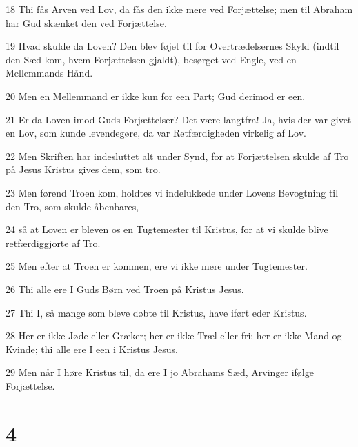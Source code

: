 \par 18 Thi fås Arven ved Lov, da fås den ikke mere ved Forjættelse; men til Abraham har Gud skænket den ved Forjættelse.
\par 19 Hvad skulde da Loven? Den blev føjet til for Overtrædelsernes Skyld (indtil den Sæd kom, hvem Forjættelsen gjaldt), besørget ved Engle, ved en Mellemmands Hånd.
\par 20 Men en Mellemmand er ikke kun for een Part; Gud derimod er een.
\par 21 Er da Loven imod Guds Forjættelser? Det være langtfra! Ja, hvis der var givet en Lov, som kunde levendegøre, da var Retfærdigheden virkelig af Lov.
\par 22 Men Skriften har indesluttet alt under Synd, for at Forjættelsen skulde af Tro på Jesus Kristus gives dem, som tro.
\par 23 Men førend Troen kom, holdtes vi indelukkede under Lovens Bevogtning til den Tro, som skulde åbenbares,
\par 24 så at Loven er bleven os en Tugtemester til Kristus, for at vi skulde blive retfærdiggjorte af Tro.
\par 25 Men efter at Troen er kommen, ere vi ikke mere under Tugtemester.
\par 26 Thi alle ere I Guds Børn ved Troen på Kristus Jesus.
\par 27 Thi I, så mange som bleve døbte til Kristus, have iført eder Kristus.
\par 28 Her er ikke Jøde eller Græker; her er ikke Træl eller fri; her er ikke Mand og Kvinde; thi alle ere I een i Kristus Jesus.
\par 29 Men når I høre Kristus til, da ere I jo Abrahams Sæd, Arvinger ifølge Forjættelse.

\chapter{4}

